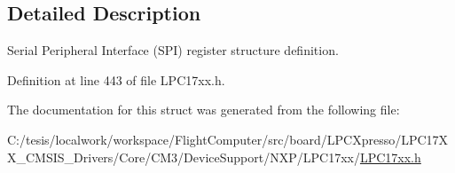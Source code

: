 \subsection{\-Detailed \-Description}
\-Serial \-Peripheral \-Interface (\-S\-P\-I) register structure definition. 

\-Definition at line 443 of file \-L\-P\-C17xx.\-h.



\-The documentation for this struct was generated from the following file\-:\begin{DoxyCompactItemize}
\item 
\-C\-:/tesis/localwork/workspace/\-Flight\-Computer/src/board/\-L\-P\-C\-Xpresso/\-L\-P\-C17\-X\-X\-\_\-\-C\-M\-S\-I\-S\-\_\-\-Drivers/\-Core/\-C\-M3/\-Device\-Support/\-N\-X\-P/\-L\-P\-C17xx/\hyperlink{_l_p_c17xx_8h}{\-L\-P\-C17xx.\-h}\end{DoxyCompactItemize}
